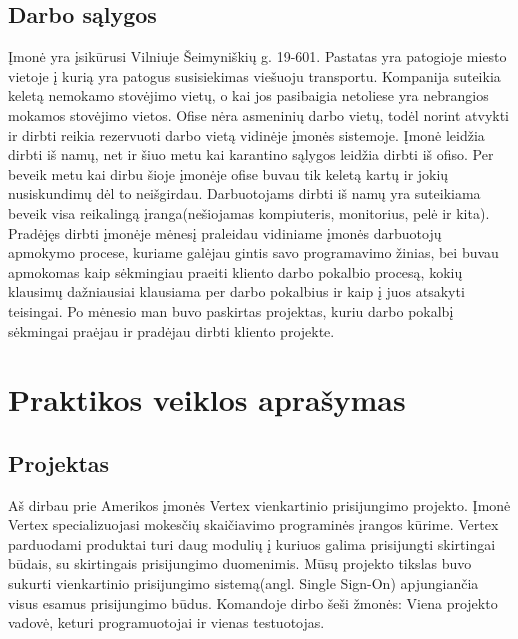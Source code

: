 \documentclass{VUMIFPSkursinis}
\begin{document}
	\subsection{Darbo sąlygos}
			Įmonė yra įsikūrusi Vilniuje Šeimyniškių g. 19-601.
			Pastatas yra patogioje miesto vietoje į kurią yra patogus susisiekimas viešuoju transportu.
			Kompanija suteikia keletą nemokamo stovėjimo vietų, o kai jos pasibaigia netoliese yra nebrangios mokamos
			stovėjimo vietos.
			Ofise nėra asmeninių darbo vietų, todėl norint atvykti ir dirbti reikia rezervuoti darbo vietą vidinėje
			įmonės sistemoje.
			Įmonė leidžia dirbti iš namų, net ir šiuo metu kai karantino sąlygos leidžia dirbti iš ofiso.
			Per beveik metu kai dirbu šioje įmonėje ofise buvau tik keletą kartų ir jokių nusiskundimų dėl to neišgirdau.
			Darbuotojams dirbti iš namų yra suteikiama beveik visa reikalingą įranga(nešiojamas kompiuteris, monitorius, pelė ir kita).
			Pradėjęs dirbti įmonėje mėnesį praleidau vidiniame įmonės darbuotojų apmokymo procese, kuriame galėjau 
			gintis savo programavimo žinias, bei buvau apmokomas kaip sėkmingiau praeiti kliento darbo pokalbio procesą, 
			kokių klausimų dažniausiai klausiama per darbo pokalbius ir kaip į juos atsakyti teisingai.
			Po mėnesio man buvo paskirtas projektas, kuriu darbo pokalbį sėkmingai praėjau ir pradėjau dirbti kliento projekte.
		
		
\section{Praktikos veiklos aprašymas}
	\subsection{Projektas}
		Aš dirbau prie Amerikos įmonės Vertex vienkartinio prisijungimo projekto. Įmonė Vertex specializuojasi mokesčių
		skaičiavimo programinės įrangos kūrime. Vertex parduodami produktai turi daug modulių į kuriuos galima prisijungti skirtingai būdais, su skirtingais prisijungimo duomenimis. Mūsų projekto tikslas buvo sukurti vienkartinio 
		prisijungimo sistemą(angl. Single Sign-On) apjungiančia visus esamus prisijungimo būdus.
		Komandoje dirbo šeši žmonės: Viena projekto vadovė, keturi programuotojai ir vienas testuotojas.
		
\end{document}
